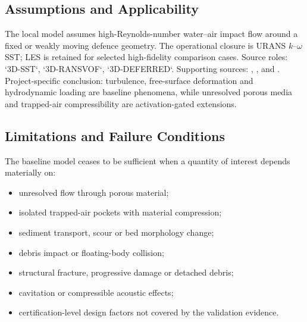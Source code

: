 
\subsection{Assumptions and Applicability}
\label{sec:res-mod-asm-assumptions}


The local model assumes high-Reynolds-number water--air impact flow
around a fixed or weakly moving defence geometry. The operational
closure is URANS $k$--$\omega$ SST; LES is retained for selected
high-fidelity comparison cases. Source roles: `3D-SST`,
`3D-RANSVOF`, `3D-DEFERRED`. Supporting sources:
\textcite{menter1994twoequation}, \textcite{kozelkov2022turbulence},
\textcite{deljesus2012porous} and \textcite{istrati2019trappedair}.
Project-specific conclusion: turbulence, free-surface deformation and
hydrodynamic loading are baseline phenomena, while unresolved porous
media and trapped-air compressibility are activation-gated extensions.

\subsection{Limitations and Failure Conditions}
\label{sec:res-mod-asm-limitations}


The baseline model ceases to be sufficient when a quantity of interest
depends materially on:

\begin{itemize}
  \item unresolved flow through porous material;
  \item isolated trapped-air pockets with material compression;
  \item sediment transport, scour or bed morphology change;
  \item debris impact or floating-body collision;
  \item structural fracture, progressive damage or detached debris;
  \item cavitation or compressible acoustic effects;
  \item certification-level design factors not covered by the
    validation evidence.
\end{itemize}

